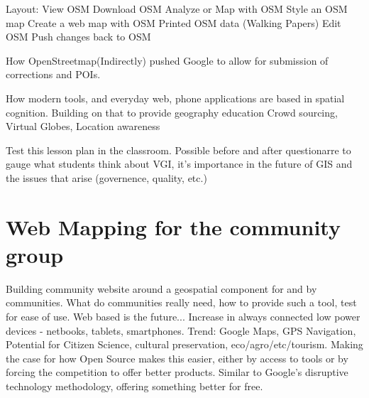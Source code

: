 \documentclass[12pt,letterpaper,draft]{article}
\begin{document}
	Layout:
		View OSM
		Download OSM
		Analyze or Map with OSM
			Style an OSM map
			Create a web map with OSM
			Printed OSM data (Walking Papers)
		Edit OSM
		Push changes back to OSM

	How OpenStreetmap(Indirectly) pushed Google to allow for submission of corrections and POIs.

	How modern tools, and everyday web, phone applications are based in spatial cognition.
	Building on that to provide geography education
	Crowd sourcing, Virtual Globes, Location awareness

	Test this lesson plan in the classroom. Possible before and after questionarre to gauge what students think about VGI, it's importance in the future of GIS and the issues that arise (governence, quality, etc.)


\section{Web Mapping for the community group}
	Building community website around a geospatial component for and by communities. What do communities really need, how to provide such a tool, test for ease of use.
	Web based is the future...
		Increase in always connected low power devices - netbooks, tablets, smartphones.
		Trend: Google Maps, GPS Navigation,  
	Potential for Citizen Science, cultural preservation, eco/agro/etc/tourism.
	Making the case for how Open Source makes this easier, either by access to tools or by forcing the competition to offer better products. Similar to Google's disruptive technology methodology, offering something better for free.
\end{document}
